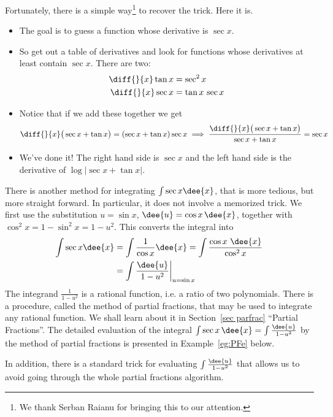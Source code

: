 \begin{eg}
\begin{itemize}
Fortunately, there is a simple
way\footnote{We thank Serban Raianu for bringing this to our attention.} 
to recover the trick. Here it is.
\begin{itemize}
   \item  The goal is to guess a function whose derivative is $\sec x$.
   \item  So get out a table of derivatives and look for functions whose
              derivatives at least contain $\sec x$. There are two:
   \begin{align*}
      \diff{}{x}\tan x &= \sec^2 x \\
      \diff{}{x}\sec x &= \tan x\,\sec x
   \end{align*}
   \item Notice that if we add these together we get
       \begin{align*}
       \diff{}{x}\big(\sec x+\tan x\big) =(\sec x+\tan x)\sec x
       \implies \frac{\diff{}{x}\big(\sec x+\tan x\big)}{\sec x+\tan x}=\sec x
       \end{align*}
  \item We've done it! The right hand side is $\sec x$ and the left hand side
        is the derivative of $\log|\sec x+\tan x|$.
\end{itemize}

\end{itemize}
\end{eg}
There is another method for integrating $\int \sec x\dee{x}$, that is
more tedious, but more straight forward. In particular, it does not involve 
a memorized trick. We first use the substitution $u=\sin x$, 
$\dee{u}=\cos x\,\dee{x}$, together with $\cos^2 x = 1-\sin^2x=1-u^2$. 
This converts the integral into
\begin{align*}
\int \sec x\dee{x}
  &= \int\frac{1}{\cos x}\dee{x} 
  = \int\frac{\cos x\ \dee{x}}{\cos^2 x} \\
  &= \int \frac{\dee{u}}{1-u^2}\bigg|_{u=\sin x}
\end{align*}
The integrand $\frac{1}{1-u^2}$ is a rational function,
i.e. a ratio of two polynomials. There is a procedure, called  the method of
partial fractions, that may be used to integrate any rational function.
We shall learn about it in Section~\ref{sec parfrac} ``Partial Fractions''. 
The detailed evaluation of the integral $\int \sec x\,\dee{x}
=\int\frac{\dee{u}}{1-u^2}$ by the method of partial fractions is presented 
in Example~\ref{eg:PFe} below.

In addition, there is a standard trick for evaluating $\int\frac{\dee{u}}{1-u^2}$ that allows us to avoid going through the whole partial fractions algorithm.

